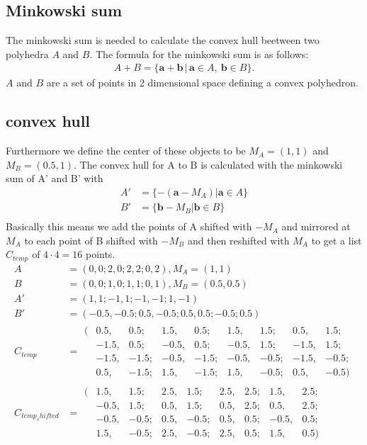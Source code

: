 \subsection{Minkowski sum}
The minkowski sum is needed to calculate the convex hull beetween two polyhedra $A$ and $B$. The formula for the minkowski sum is as follows:
\begin{align*}
 A + B = \{\mathbf{a}+\mathbf{b}\,|\,\mathbf{a}\in A,\ \mathbf{b}\in B\}. 
\end{align*}
$A$ and $B$ are a set of points in 2 dimensional space defining a convex polyhedron. 

\subsection{convex hull} %
Furthermore we define the center of these objects to be $M_A = (1,1)$ and $M_B = (0.5 , 1)$.
The convex hull for A to B is calculated with the minkowski sum of A' and B' with
\begin{align*}
A'  &= \{ -(\mathbf{a} - M_A) |\mathbf{a} \in A \}\\
B'  &= \{ \mathbf{b} - M_B |\mathbf{b} \in B \}\\
\end{align*}
Basically this means we add the points of A shifted with $-M_A$ and mirrored at $M_A$ to each point of B shifted with $-M_B$ and then reshifted with $M_A$ to get a list $C_{temp}$ of $4\cdot 4 = 16$  points.
\begin{align*}
A &= 	( 0 , 0; 2 , 0; 2, 2; 0, 2), M_A =( 1, 1)\\
B &= (0, 0; 1, 0; 1, 1; 0, 1),  M_B =(0.5, 0.5)\\
A' &= (1, 1; -1, 1; -1, -1; 1, -1)\\
B' &= (-0.5, -0.5; 0.5, -0.5; 0.5, 0.5; -0.5; 0.5)\\
C_{temp} &=	\begin{matrix}
		(&0.5, &0.5; &1.5, &0.5; &1.5, &1.5; &0.5, &1.5;\\
		&-1.5, &0.5; &-0.5, &0.5; &-0.5, &1.5; &-1.5, &1.5;\\
		&-1.5, &-1.5; &-0.5, &-1.5; &-0.5, &-0.5; &-1.5, &-0.5;\\
		&0.5, &-1.5; &1.5, &-1.5; &1.5, &-0.5; &0.5, &-0.5)
		\end{matrix}\\
C_{temp_shifted} &= \begin{matrix}
		(&1.5, &1.5; &2.5, &1.5; &2.5, &2.5; &1.5, &2.5;\\
		&-0.5, &1.5; &0.5, &1.5; &0.5, &2.5; &0.5, &2.5;\\
		&-0.5, &-0.5; &0.5, &-0.5; &0.5, &0.5; &-0.5, &0.5;\\
		&1.5, &-0.5; &2.5, &-0.5; &2.5, &0.5; &1.5, &0.5)
		\end{matrix}\\
\end{align*}
